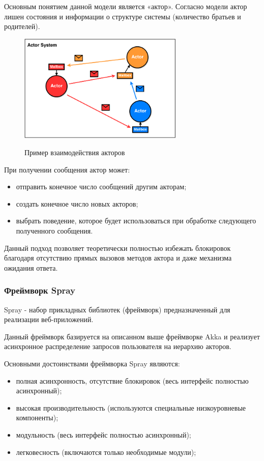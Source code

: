 Основным понятием данной модели является «актор». Согласно модели актор лишен состояния и информации о структуре системы (количество братьев и родителей). 

\begin{figure}[ht]
    \centering
    \includegraphics[width=0.7\textwidth]{figures/actor_model.png}
    \label{fig:techs:akka:actor_model:comulication}
    \caption{Пример взаимодействия акторов}
\end{figure}

При получении сообщения актор может:
\begin{itemize}
  \item отправить конечное число сообщений другим акторам;
  \item создать конечное число новых акторов;
  \item выбрать поведение, которое будет использоваться при обработке следующего полученного сообщения.
\end{itemize}

Данный подход позволяет теоретически полностью избежать блокировок благодаря отсутствию прямых вызовов методов актора и даже механизма ожидания ответа.

\subsubsection{Фреймворк Spray}
\label{sec:techs:spray}

Spray - набор прикладных библиотек (фреймворк) предназначенный для реализации веб-приложений.

Данный фреймворк базируется на описанном выше фреймворке Akka и реализует асинхронное распределение запросов пользователя на иерархию акторов. 

Основными достоинствами фреймворка Spray являются:
\begin{itemize}
  \item полная асинхронность, отсутствие блокировок (весь интерфейс полностью асинхронный);
  \item высокая производительность (используются специальные низкоуровневые компоненты);
  \item модульность (весь интерфейс полностью асинхронный);
  \item легковесность (включаются только необходимые модули);
\end{itemize}

